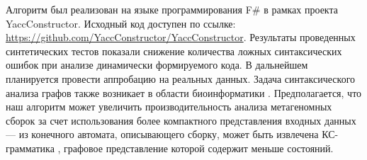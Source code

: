 \documentclass [a4paper] {article}
\begin{document}
Алгоритм был реализован на языке программирования F$\#$ в рамках проекта YaccConstructor. Исходный код доступен по ссылке: \url{ https://github.com/YaccConstructor/YaccConstructor}. Результаты проведенных синтетических тестов показали снижение количества ложных синтаксических ошибок при анализе динамически формируемого кода. В дальнейшем планируется провести аппробацию на реальных данных.
Задача синтаксического анализа графов также возникает в области биоинформатики \cite{kovalev-spbu-gll_reg}. 
Предполагается, что наш алгоритм может увеличить производительность анализа метагеномных сборок за счет использования более компактного представления входных данных --- из конечного автомата, описывающего сборку, может быть извлечена КС-грамматика \cite{kovalev-spbu-cf_extr}, графовое представление которой содержит меньше состояний.

\printbibliography

\end{document}
